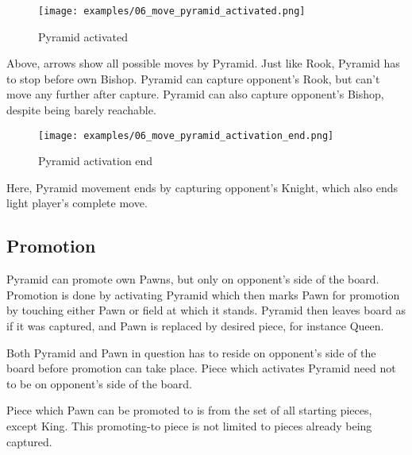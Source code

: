 \clearpage %

\noindent
\begin{figure}[!h]
\texttt{[image: examples/06\_move\_pyramid\_activated.png]}
\caption{Pyramid activated}
\label{fig:06_move_pyramid_activated}
\end{figure}

Above, arrows show all possible moves by Pyramid. Just like Rook, Pyramid has to
stop before own Bishop. Pyramid can capture opponent's Rook, but can't move any
further after capture. Pyramid can also capture opponent's Bishop, despite being
barely reachable.

\clearpage %

\noindent
\begin{figure}[!h]
\texttt{[image: examples/06\_move\_pyramid\_activation\_end.png]}
\caption{Pyramid activation end}
\label{fig:06_move_pyramid_activation_end}
\end{figure}

Here, Pyramid movement ends by capturing opponent's Knight, which also ends light
player's complete move.

\clearpage %

\subsection*{Promotion}

Pyramid can promote own Pawns, but only on opponent's side of the board.
Promotion is done by activating Pyramid which then marks Pawn for promotion
by touching either Pawn or field at which it stands. Pyramid then leaves
board as if it was captured, and Pawn is replaced by desired piece, for
instance Queen.

Both Pyramid and Pawn in question has to reside on opponent's side of the
board before promotion can take place. Piece which activates Pyramid need
not to be on opponent's side of the board.

Piece which Pawn can be promoted to is from the set of all starting pieces,
except King. This promoting-to piece is not limited to pieces already being
captured.

